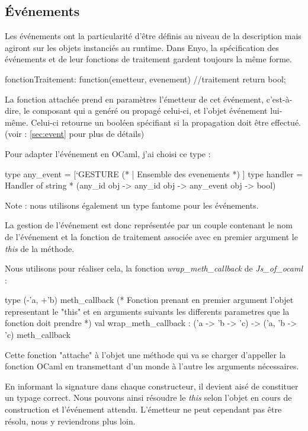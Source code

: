 \documentclass[11pt,a4paper]{report}
\begin{document}
\subsection{\'Evénements}

Les événements ont la particularité d'être définis au niveau de la description mais agiront sur les objets
instanciés au runtime. Dans Enyo, la spécification des événements et de leur fonctions 
de traitement gardent toujours la même forme.

\begin{JavaScript}
  fonctionTraitement: function(emetteur, evenement){
                          //traitement
                          return bool; }
\end{JavaScript}

La fonction attachée prend en paramètres l'émetteur de cet événement, c'est-à-dire, 
le composant qui a genéré ou propagé celui-ci, et l'objet événement lui-même.
Celui-ci retourne un booléen spécifiant si la propagation doit être effectué.
(voir : \ref{sec:event} pour plus de détails)

Pour adapter l'événement en OCaml, j'ai choisi ce type :
\begin{OCaml}
  type any_event = [`GESTURE (* |  Ensemble des evenements *) ]
  type handler = Handler of string * (any_id obj -> any_id obj -> any_event obj -> bool)
\end{OCaml}

Note : nous utilisons également un type fantome pour les événements.

La gestion de l'événement est donc représentée par un couple contenant le nom de l'événement et la 
fonction de traitement associée avec en premier argument le \emph{this} de la méthode.

Nous utilisons pour réaliser cela, la fonction \emph{wrap\_meth\_callback} de \emph{Js\_of\_ocaml} :
\begin{OCaml}
type (-'a, +'b) meth_callback
(* Fonction prenant en premier argument l'objet representant le "this"
   et en arguments suivants les differents parametres que la
   fonction doit prendre *)
val wrap_meth_callback : ('a -> 'b -> 'c) -> ('a, 'b -> 'c) meth_callback
\end{OCaml}

Cette fonction "attache" à l'objet une méthode qui va se charger d'appeller la fonction OCaml
en transmettant d'un monde à l'autre les arguments nécessaires.

En informant la signature dans chaque constructeur, il devient aisé de constituer un typage correct.
Nous pouvons ainsi résoudre le \emph{this} selon l'objet en cours de construction et l'événement attendu.
L'émetteur ne peut cependant pas être résolu, nous y reviendrons plus loin.
\end{document}
